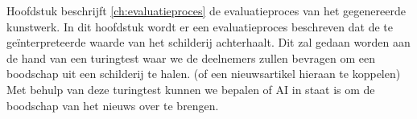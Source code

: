 Hoofdstuk beschrijft \ref{ch:evaluatieproces} de evaluatieproces van het gegenereerde kunstwerk. In dit hoofdstuk wordt er een evaluatieproces beschreven dat de te geïnterpreteerde waarde van het schilderij achterhaalt. Dit zal gedaan worden aan de hand van een turingtest waar we de deelnemers zullen bevragen om een boodschap uit een schilderij te halen. (of een nieuwsartikel hieraan te koppelen) Met behulp van deze turingtest kunnen we bepalen of AI in staat is om de boodschap van het nieuws over te brengen.


